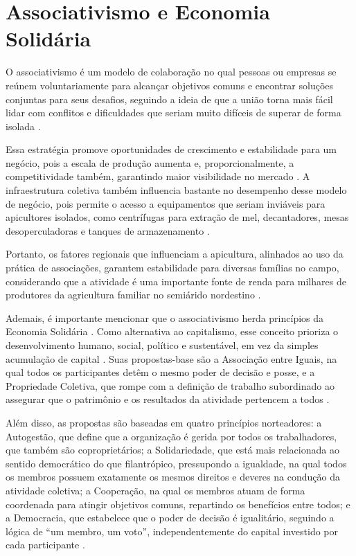 \section{Associativismo e Economia Solidária}\label{sec:citacoes}

O associativismo é um modelo de colaboração no qual pessoas ou empresas se reúnem voluntariamente para alcançar objetivos comuns e encontrar soluções conjuntas para seus desafios, seguindo a ideia de que a união torna mais fácil lidar com conflitos e dificuldades que seriam muito difíceis de superar de forma isolada \cite{sousa2022}.

Essa estratégia promove oportunidades de crescimento e estabilidade para um negócio, pois a escala de produção aumenta e, proporcionalmente, a competitividade também, garantindo maior visibilidade no mercado \cite{sousa2022}. A infraestrutura coletiva também influencia bastante no desempenho desse modelo de negócio, pois permite o acesso a equipamentos que seriam inviáveis para apicultores isolados, como centrífugas para extração de mel, decantadores, mesas desoperculadoras e tanques de armazenamento \cite{aguiar2026}.

Portanto, os fatores regionais que influenciam a apicultura, alinhados ao uso da prática de associações, garantem estabilidade para diversas famílias no campo, considerando que a atividade é uma importante fonte de renda para milhares de produtores da agricultura familiar no semiárido nordestino \cite{araujo2024, aguiar2026}.

Ademais, é importante mencionar que o associativismo herda princípios da Economia Solidária \cite{singer2002}. Como alternativa ao capitalismo, esse conceito prioriza o desenvolvimento humano, social, político e sustentável, em vez da simples acumulação de capital \cite{leal2018}. Suas propostas-base são a Associação entre Iguais, na qual todos os participantes detêm o mesmo poder de decisão e posse, e a Propriedade Coletiva, que rompe com a definição de trabalho subordinado ao assegurar que o patrimônio e os resultados da atividade pertencem a todos \cite{leal2018,singer2002}.

Além disso, as propostas são baseadas em quatro princípios norteadores: a Autogestão, que define que a organização é gerida por todos os trabalhadores, que também são coproprietários; a Solidariedade, que está mais relacionada ao sentido democrático do que filantrópico, pressupondo a igualdade, na qual todos os membros possuem exatamente os mesmos direitos e deveres na condução da atividade coletiva; a Cooperação, na qual os membros atuam de forma coordenada para atingir objetivos comuns, repartindo os benefícios entre todos; e a Democracia, que estabelece que o poder de decisão é igualitário, seguindo a lógica de “um membro, um voto”, independentemente do capital investido por cada participante \cite{leal2018}.

